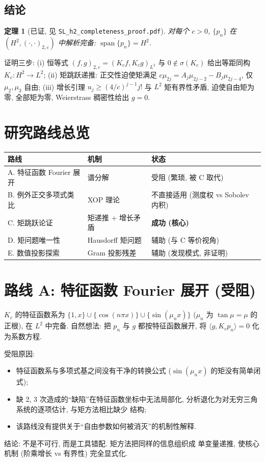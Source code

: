 \documentclass[UTF8]{ctexart}
\newtheorem{theorem}{定理}[section]
\begin{document}
\subsection{结论}

\begin{theorem}[已证, 见 \texttt{SL\_h2\_completeness\_proof.pdf}]
对每个 $c > 0$, $\{p_n\}$ 在 $(H^2, (\cdot,\cdot)_{2,c})$ 中解析完备:
$\overline{\operatorname{span}\{p_n\}} = H^2$.
\end{theorem}

证明三步: (i) 恒等式 $(f,g)_{2,c} = (K_c f, K_c g)_{L^2}$ 与 $0 \notin \sigma(K_c)$
给出等距同构 $K_c: H^2 \to L^2$; (ii) 矩跳跃递推: 正交性迫使矩满足
$c\mu_{2j} = A_j\mu_{2j-2} - B_j\mu_{2j-4}$, 仅 $\mu_2, \mu_3$ 自由;
(iii) 增长引理 $u_j \geq (4/c)^{j-1}j!$ 与 $L^2$ 矩有界性矛盾,
迫使自由矩为零, 全部矩为零, Weierstrass 稠密性给出 $g = 0$.

\section{研究路线总览}

\begin{center}
\begin{tabular}{lll}
\toprule
路线 & 机制 & 状态 \\
\midrule
A. 特征函数 Fourier 展开 & 谱分解 & 受阻 (繁琐, 被 C 取代) \\
B. 例外正交多项式类比 & XOP 理论 & 不直接适用 (测度权 vs Sobolev 内积) \\
C. 矩跳跃论证 & 矩递推 + 增长矛盾 & \textbf{成功 (核心)} \\
D. 矩问题唯一性 & Hausdorff 矩问题 & 辅助 (与 C 等价视角) \\
E. 数值投影探索 & Gram 投影残差 & 辅助 (发现模式, 非证明) \\
\bottomrule
\end{tabular}
\end{center}

\section{路线 A: 特征函数 Fourier 展开 (受阻)}

$K_c$ 的特征函数系为 $\{1, x\} \cup \{\cos(n\pi x)\} \cup \{\sin(\mu_n x)\}$
($\mu_n$ 为 $\tan\mu = \mu$ 的正根), 在 $L^2$ 中完备. 自然想法: 把 $p_n$ 与
$g$ 都按特征函数展开, 将 $\langle g, K_c p_n\rangle = 0$ 化为系数方程.

受阻原因:
\begin{itemize}
	\item 特征函数系与多项式基之间没有干净的转换公式
		($\sin(\mu_n x)$ 的矩没有简单闭式);
	\item 缺 2, 3 次造成的``缺陷''在特征函数坐标中无法局部化,
		分析退化为对无穷三角系统的逐项估计, 与矩方法相比缺少
		结构;
	\item 该路线没有提供关于``自由参数如何被消灭''的机制性解释.
\end{itemize}
结论: 不是不可行, 而是工具错配. 矩方法把同样的信息组织成
单变量递推, 使核心机制 (阶乘增长 vs 有界性) 完全显式化.
\end{document}
